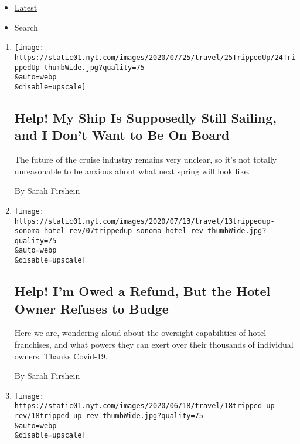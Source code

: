 \begin{itemize}
\tightlist
\item
  \protect\hyperlink{stream-panel}{Latest}
\item
  Search
\end{itemize}

\begin{enumerate}
\def\labelenumi{\arabic{enumi}.}
\item
  \href{/2020/07/22/travel/virus-cruise-refunds.html}{}

  \texttt{[image: https://static01.nyt.com/images/2020/07/25/travel/25TrippedUp/24TrippedUp-thumbWide.jpg?quality=75\\\&auto=webp\\\&disable=upscale]}

  \hypertarget{help-my-ship-is-supposedly-still-sailing-and-i-dont-want-to-be-on-board}{%
  \subsection{Help! My Ship Is Supposedly Still Sailing, and I Don't
  Want to Be On
  Board}\label{help-my-ship-is-supposedly-still-sailing-and-i-dont-want-to-be-on-board}}

  The future of the cruise industry remains very unclear, so it's not
  totally unreasonable to be anxious about what next spring will look
  like.

  By Sarah Firshein
\item
  \href{/2020/07/07/travel/virus-refunds-hotel-franchises.html}{}

  \texttt{[image: https://static01.nyt.com/images/2020/07/13/travel/13trippedup-sonoma-hotel-rev/07trippedup-sonoma-hotel-rev-thumbWide.jpg?quality=75\\\&auto=webp\\\&disable=upscale]}

  \hypertarget{help-im-owed-a-refund-but-the-hotel-owner-refuses-to-budge}{%
  \subsection{Help! I'm Owed a Refund, But the Hotel Owner Refuses to
  Budge}\label{help-im-owed-a-refund-but-the-hotel-owner-refuses-to-budge}}

  Here we are, wondering aloud about the oversight capabilities of hotel
  franchises, and what powers they can exert over their thousands of
  individual owners. Thanks Covid-19.

  By Sarah Firshein
\item
  \href{/2020/06/18/travel/travel-refunds-airlines.html}{}

  \texttt{[image: https://static01.nyt.com/images/2020/06/18/travel/18tripped-up-rev/18tripped-up-rev-thumbWide.jpg?quality=75\\\&auto=webp\\\&disable=upscale]}


\end{enumerate}
